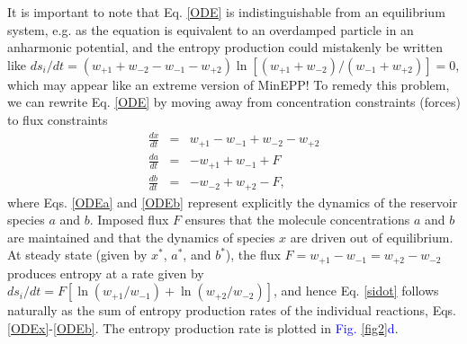 \documentclass[aps,prl,reprint,singlecolumn,superscriptaddress]{revtex4}
\begin{document}
{It is important to note that Eq. \ref{ODE} is indistinguishable from an equilibrium system, e.g. as the equation is equivalent to
an overdamped particle in an anharmonic potential, and the entropy production could mistakenly be written like 
$ds_i/dt=(w_{+1}+w_{-2}-w_{-1}-w_{+2})\ln[(w_{+1}+w_{-2})/(w_{-1}+w_{+2})]=0$, which may appear like an extreme version 
of MinEPP! To remedy this problem, we can rewrite Eq. \ref{ODE} by moving away from concentration constraints (forces) to flux constraints
\begin{subequations}
\begin{eqnarray}
\frac{dx}{dt}&=&w_{+1}-w_{-1}+w_{-2}-w_{+2}\label{ODEx}\\
\frac{da}{dt}&=&-w_{+1}+w_{-1}+F\label{ODEa}\\
\frac{db}{dt}&=&-w_{-2}+w_{+2}-F\label{ODEb},
\end{eqnarray}
\end{subequations}
where Eqs. \ref{ODEa} and \ref{ODEb} represent explicitly the dynamics of the reservoir species $a$ and $b$. Imposed flux $F$ ensures 
that the molecule concentrations $a$ and $b$ are maintained and that the dynamics of species $x$ are driven out of equilibrium.
At steady state (given by $x^*$, $a^*$, and $b^*$), 
the flux $F=w_{+1}-w_{-1}=w_{+2}-w_{-2}$ produces entropy at a rate given by $ds_i/dt=F[\ln(w_{+1}/w_{-1})+\ln(w_{+2}/w_{-2})]$,
and hence Eq. \ref{sidot} follows naturally as the sum of entropy production rates of the individual reactions, Eqs. \ref{ODEx}-\ref{ODEb}.
The entropy production rate is plotted in \textcolor{blue}{Fig. \ref{fig2}d}.



}
\end{document}
